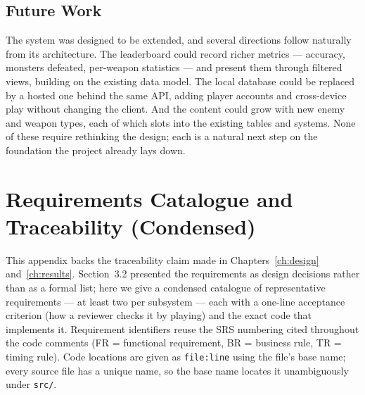\documentclass[12pt,a4paper]{report}
\begin{document}
\section{Future Work}

The system was designed to be extended, and several directions follow naturally
from its architecture. The leaderboard could record richer metrics --- accuracy,
monsters defeated, per-weapon statistics --- and present them through filtered
views, building on the existing data model. The local database could be replaced
by a hosted one behind the same API, adding player accounts and cross-device play
without changing the client. And the content could grow with new enemy and weapon
types, each of which slots into the existing tables and systems. None of these
require rethinking the design; each is a natural next step on the foundation the
project already lays down.

\appendix

\chapter{Requirements Catalogue and Traceability (Condensed)}
\label{app:trace}

This appendix backs the traceability claim made in Chapters~\ref{ch:design}
and~\ref{ch:results}. Section~3.2 presented the requirements as design decisions
rather than as a formal list; here we give a condensed catalogue of representative
requirements --- at least two per subsystem --- each with a one-line acceptance
criterion (how a reviewer checks it by playing) and the exact code that implements
it. Requirement identifiers reuse the SRS numbering cited throughout the code
comments (FR = functional requirement, BR = business rule, TR = timing rule). Code
locations are given as \texttt{file:line} using the file's base name; every source
file has a unique name, so the base name locates it unambiguously under
\texttt{src/}.
\end{document}
